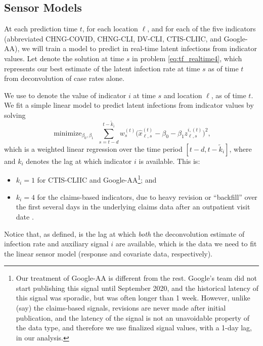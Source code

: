 \documentclass[sts]{imsart}
\newcommand{\minimize}{\mathop{\mathrm{minimize}}}
\def\hx{\hat{x}}
\theoremstyle{plain}
\theoremstyle{definition}
\theoremstyle{remark}
\begin{document}
\subsection{Sensor Models}
\label{sec:sensor_models}

At each prediction time $t$, for each location $\ell$, and for each of the five
indicators (abbreviated CHNG-COVID, CHNG-CLI, DV-CLI, CTIS-CLIIC, and
Google-AA), we will train a model to predict in real-time
latent infections from indicator values. Let \smash{$\hx^{(t)}_{\ell,s}$} denote
the solution at time $s$ in problem \eqref{eq:tf_realtime4}, which represents
our best estimate of the latent infection rate at time $s$ as of time $t$ from
deconvolution of case rates alone. 

We use  to denote the value of indicator $i$ at time
$s$ and location $\ell$, as of time $t$. We fit a simple linear model to predict 
latent infections from indicator values by solving 
\begin{equation}
\label{eq:sensor_reg}
\minimize_{\beta_0, \beta_1} \; \sum_{s = t-d}^{t-\tilde{k}_i}
w^{(t)}_s \big( \hx^{(t)}_{\ell,s} - \beta_0 - \beta_1 z^{i,(t)}_{\ell,s} \big)^2,
\end{equation}
which is a weighted linear regression over the time period $[t-d,
t-\tilde{k}_i]$, where  and $k_i$ denotes
the lag at which indicator $i$ is available. This is:
\begin{itemize}
\item $k_i=1$ for CTIS-CLIIC and
  Google-AA\footnote{Our treatment of Google-AA is different from the 
  rest. Google's team did not start publishing this signal until September 2020,
  and the historical latency of this signal was sporadic, but was often longer
  than 1 week. However, unlike (say) the claims-based signals, revisions are
  never made after initial publication, and the latency of the signal is not an
  unavoidable property of the data type, and therefore we use finalized signal
  values, with a 1-day lag, in our analysis.}; and 
\item $k_i=4$ for the claims-based indicators, due to heavy revision or
  ``backfill'' over the first several days in the underlying claims data after
  an outpatient visit date \citep{Reinhart:2021}. 
\end{itemize}
Notice that, as defined,  is the lag at which \emph{both}
the deconvolution estimate of infection rate and auxiliary signal $i$ are
available, which is the data we need to fit the linear sensor model (response
and covariate data, respectively). 
\end{document}
